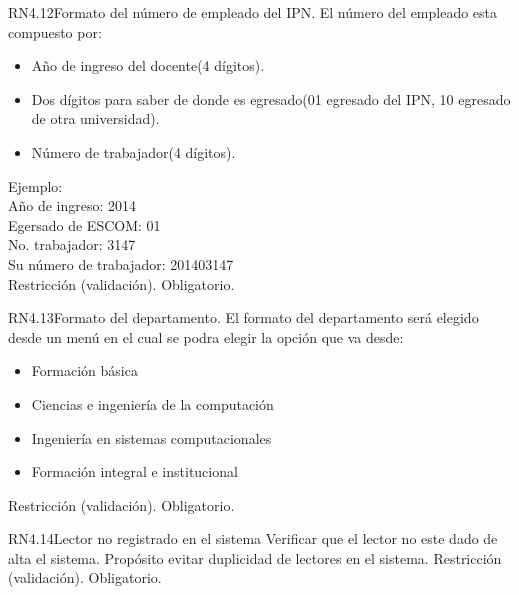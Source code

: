 \begin{BussinesRule}{RN4.12}{Formato del número de empleado del IPN.}
	\BRitem[Descripción:] El número del empleado esta compuesto por:
		\begin{itemize} 
			\item Año de ingreso del docente(4 dígitos).
			\item Dos dígitos para saber de donde es egresado(01 egresado del IPN, 10 egresado de otra universidad).
			\item Número de trabajador(4 dígitos).
		\end{itemize}
	Ejemplo:\\
		Año de ingreso: 2014\\
		Egersado de ESCOM: 01\\
		No. trabajador: 3147\\
		Su número de trabajador: 201403147\\
	\BRitem[Tipo:] Restricción (validación).
	\BRitem[Nivel:] Obligatorio.
\end{BussinesRule}


\begin{BussinesRule}{RN4.13}{Formato del departamento.} 
	\BRitem[Descripción:] El formato del departamento será elegido desde un menú en el cual se podra elegir la opción que va desde:
		\begin{itemize}
			\item Formación básica
			\item Ciencias e ingeniería de la computación
			\item Ingeniería en sistemas computacionales
			\item Formación integral e institucional
		\end{itemize}
	\BRitem[Tipo:] Restricción (validación).
	\BRitem[Nivel:] Obligatorio.
\end{BussinesRule}


\begin{BussinesRule}{RN4.14}{Lector no registrado en el sistema} 
	\BRitem[Descripción:] Verificar que el lector no este dado de alta el sistema. Propósito evitar duplicidad de lectores en el sistema.
	\BRitem[Tipo:] Restricción (validación).
	\BRitem[Nivel:] Obligatorio.
\end{BussinesRule}

